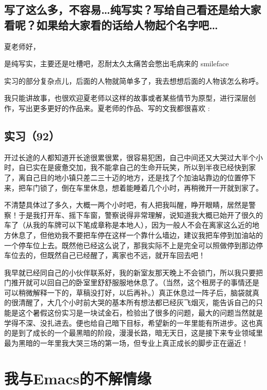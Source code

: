 \documentclass[12pt]{book}
\begin{document}
\section{写了这么多，不容易…纯写实？写给自己看还是给大家看呢？如果给大家看的话给人物起个名字吧…}
\label{sec-5-95}

夏老师好，

是纯写实，主要还是吐槽吧，忍耐太久太痛苦会憋出毛病来的 smileface

实习的部分复杂点儿，后面的人物就简单多了，我去想想后面的人物该怎么称呼。

我只能讲故事，也很欢迎夏老师以这样的故事或者某些情节为原型，进行深层创作，写出更多更好的作品来。夏老师的作品、写的文我都很喜欢 :

\section{实习（92）　}
\label{sec-5-96}

开过长途的人都知道开长途很累很累，很容易犯困，自己中间还又大哭过大半个小时，自已实在是疲惫交加，我不能拿自己的生命开玩笑，所以到半夜已经快到家了，离自己目的地小镇只差二三十迈的地方，还是找了个加油站靠边的位置停下来，把车门锁了，倒在车里休息，想着能睡着几个小时，再稍微开一开就到家了。

不清楚具体过了多久，大概一两个小时吧，有人把我叫醒，睁开眼睛，居然是警察！于是我打开车、摇下车窗，警察说得非常理解，说知道我大概已始开了很久的车了（从我的车牌可以下笔成章称是本地人），因为一般人不会在离家这么近的地方休息了，但他劝我不要把车停在这样一个靠什么墙边，建议我把车停到加油站的一个停车位上去。既然他已经这么说了，那我实际不上是完全可以照做停到那边停车位去的，但既然自己已经醒了，离家也不远，就开车回去吧！

我早就已经同自己的小伙伴联系好，我的新室友那天晚上不会锁门，所以我只要把门推开就可以回自己的卧室里舒舒服服地休息了。（当然，这个租房子的事情还是可以稍微解释一下的，草稿没打好，以后再补。）真正休息过一阵子后，脑袋就真的很清醒了，大几个小时前大哭的基本所有想法都已经灰飞烟灭，能告诉自己的只能是这个暑假这份实习是一块试金石，检验出了很多的问题，最大的问题当然就是学得不深、没扎进去。便也给自己暗下目标，希望新的一年里能有所进步。这也真的是到了成长的一个最黑暗的阶段，漫漫长路，暗无天日，这是接下来专业领域里最为黑暗的一年里我大哭三场的第一场，但专业上真正成长的脚步正在逼近！

\chapter{我与Emacs的不解情缘}
\label{sec-6}
\end{document}
